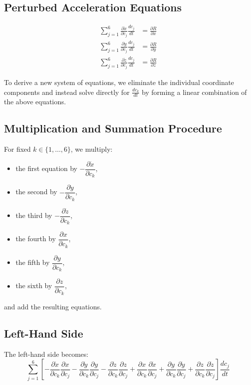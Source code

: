 \documentclass{article}
\begin{document}
\subsection*{Perturbed Acceleration Equations}
\begin{align*}
\sum_{j=1}^{6} \frac{\partial \dot{x}}{\partial c_j} \frac{dc_j}{dt} &= \frac{\partial R}{\partial x} \\
\sum_{j=1}^{6} \frac{\partial \dot{y}}{\partial c_j} \frac{dc_j}{dt} &= \frac{\partial R}{\partial y} \\
\sum_{j=1}^{6} \frac{\partial \dot{z}}{\partial c_j} \frac{dc_j}{dt} &= \frac{\partial R}{\partial z}
\end{align*}

To derive a new system of equations, we eliminate the individual coordinate components and instead solve directly for \( \frac{dc_k}{dt} \) by forming a linear combination of the above equations.

\subsection*{Multiplication and Summation Procedure}

For fixed \( k \in \{1, \dots, 6\} \), we multiply:

\begin{itemize}
  \item the first equation by \( -\dfrac{\partial \dot{x}}{\partial c_k} \),
  \item the second by \( -\dfrac{\partial \dot{y}}{\partial c_k} \),
  \item the third by \( -\dfrac{\partial \dot{z}}{\partial c_k} \),
  \item the fourth by \( \dfrac{\partial x}{\partial c_k} \),
  \item the fifth by \( \dfrac{\partial y}{\partial c_k} \),
  \item the sixth by \( \dfrac{\partial z}{\partial c_k} \),
\end{itemize}

and add the resulting equations.

\subsection*{Left-Hand Side}

The left-hand side becomes:
\[
\sum_{j=1}^{6}
\left[
- \frac{\partial \dot{x}}{\partial c_k} \frac{\partial x}{\partial c_j}
- \frac{\partial \dot{y}}{\partial c_k} \frac{\partial y}{\partial c_j}
- \frac{\partial \dot{z}}{\partial c_k} \frac{\partial z}{\partial c_j}
+ \frac{\partial x}{\partial c_k} \frac{\partial \dot{x}}{\partial c_j}
+ \frac{\partial y}{\partial c_k} \frac{\partial \dot{y}}{\partial c_j}
+ \frac{\partial z}{\partial c_k} \frac{\partial \dot{z}}{\partial c_j}
\right]
\frac{dc_j}{dt}
\]
\end{document}
